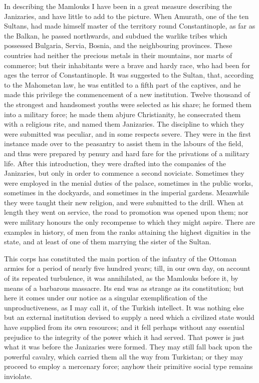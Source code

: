 In describing the Mamlouks I
have been in a great measure describing the Janizaries, and have
little to add to the picture. When Amurath, one of the ten Sultans,
had made himself master of the territory round Constantinople, as far
as the Balkan, he passed northwards, and subdued the warlike tribes
which possessed Bulgaria, Servia, Bosnia, and the neighbouring
provinces. These countries had neither the precious metals in their
mountains, nor marts of commerce; but their inhabitants were a brave
and hardy race, who had been for ages the terror of Constantinople. It
was suggested to the Sultan, that, according to the Mahometan law, he
was entitled to a fifth part of the captives, and he made this
privilege the commencement of a new institution. Twelve thousand of
the strongest and handsomest youths were selected as his share; he
formed them into a military force; he made them abjure Christianity,
he consecrated them with a religious rite, and named them Janizaries.
The discipline to which they were submitted was peculiar, and in some
respects severe. They were in the first instance made over to
the peasantry to assist them in the labours of the field, and thus
were prepared by penury and hard fare for the privations of a military
life. After this introduction, they were drafted into the companies of
the Janizaries, but only in order to commence a second noviciate.
Sometimes they were employed in the menial duties of the palace,
sometimes in the public works, sometimes in the dockyards, and
sometimes in the imperial gardens. Meanwhile they were taught their
new religion, and were submitted to the drill. When at length they
went on service, the road to promotion was opened upon them; nor were
military honours the only recompense to which they might aspire. There
are examples in history, of men from the ranks attaining the highest
dignities in the state, and at least of one of them marrying the
sister of the Sultan.

This corps has constituted the
main portion of the infantry of the Ottoman armies for a period of
nearly five hundred years; till, in our own day, on account of its
repeated turbulence, it was annihilated, as the Mamlouks before it, by
means of a barbarous massacre. Its end was as strange as its
constitution; but here it comes under our notice as a singular
exemplification of the unproductiveness, as I may call it, of the
Turkish intellect. It was nothing else but an external institution
devised to supply a need which a civilized state would have supplied
from its own resources; and it fell perhaps without any essential
prejudice to the integrity of the power which it had served. That
power is just what it was before the Janizaries were formed. They may
still fall back upon the powerful cavalry, which carried them all the
way from Turkistan; or they may proceed to employ a mercenary force;
anyhow their primitive social type remains inviolate.

